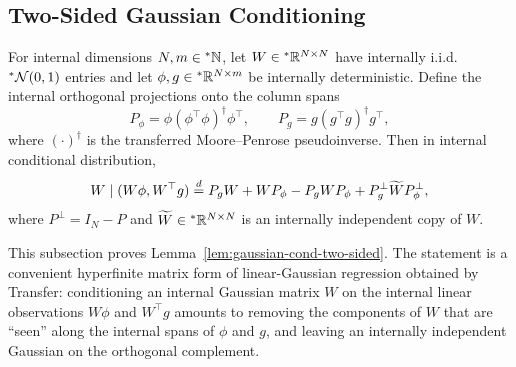 \subsection{Two-Sided Gaussian Conditioning}
\label{subsec:appa-two-sided}

\begin{lemma}
\label{lem:gaussian-cond-two-sided}
For internal dimensions $N, m \in {}^*\mathbb{N}$, let $W \in {}^*\mathbb{R}^{N \times N}$ have internally i.i.d.\ ${}^*\mathcal{N}(0, 1)$ entries and let $\phi, g \in {}^*\mathbb{R}^{N \times m}$ be internally deterministic. Define the internal orthogonal projections onto the column spans
\begin{equation}
\label{eq:appa-two-sided-proj}
P_\phi = \phi(\phi^\top \phi)^\dagger \phi^\top, \qquad
P_g = g(g^\top g)^\dagger g^\top,
\end{equation}
where $(\cdot)^\dagger$ is the transferred Moore--Penrose pseudoinverse. Then in internal conditional distribution,
\begin{equation}
\label{eq:appa-two-sided-law}
W \mid (W\phi, W^\top g) \stackrel{d}{=} P_g W + W P_\phi - P_g W P_\phi + P_g^\perp \widetilde{W} P_\phi^\perp,
\end{equation}
where $P^\perp = I_N - P$ and $\widetilde{W} \in {}^*\mathbb{R}^{N \times N}$ is an internally independent copy of $W$.
\end{lemma}

This subsection proves Lemma~\ref{lem:gaussian-cond-two-sided}. The statement is a convenient hyperfinite matrix form of linear-Gaussian regression obtained by Transfer: conditioning an internal Gaussian matrix $W$ on the internal linear observations $W\phi$ and $W^\top g$ amounts to removing the components of $W$ that are ``seen'' along the internal spans of $\phi$ and $g$, and leaving an internally independent Gaussian on the orthogonal complement.

